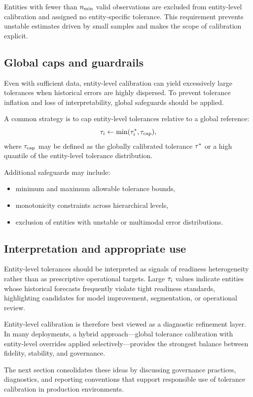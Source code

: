 Entities with fewer than $n_{\min}$ valid observations are excluded from
entity-level calibration and assigned no entity-specific tolerance.
This requirement prevents unstable estimates driven by small samples and makes
the scope of calibration explicit.

\subsection{Global caps and guardrails}
\label{subsec:entity_guards}

Even with sufficient data, entity-level calibration can yield excessively large
tolerances when historical errors are highly dispersed.
To prevent tolerance inflation and loss of interpretability, global safeguards
should be applied.

A common strategy is to cap entity-level tolerances relative to a global
reference:
\[
    \tau_{i} \leftarrow \min(\tau^{\ast}_{i}, \tau_{\mathrm{cap}}),
\]
where $\tau_{\mathrm{cap}}$ may be defined as the globally calibrated tolerance $\tau^{\ast}$
or a high quantile of the entity-level tolerance distribution.

Additional safeguards may include:
\begin{itemize}[leftmargin=*]
    \item minimum and maximum allowable tolerance bounds,
    \item monotonicity constraints across hierarchical levels,
    \item exclusion of entities with unstable or multimodal error distributions.
\end{itemize}

\subsection{Interpretation and appropriate use}
\label{subsec:entity_interpretation}

Entity-level tolerances should be interpreted as signals of readiness
heterogeneity rather than as prescriptive operational targets.
Large $\tau_{i}$ values indicate entities whose historical forecasts frequently
violate tight readiness standards, highlighting candidates for model improvement,
segmentation, or operational review.

Entity-level calibration is therefore best viewed as a diagnostic refinement
layer.
In many deployments, a hybrid approach—global tolerance calibration with
entity-level overrides applied selectively—provides the strongest balance
between fidelity, stability, and governance.

The next section consolidates these ideas by discussing governance practices,
diagnostics, and reporting conventions that support responsible use of tolerance
calibration in production environments.
